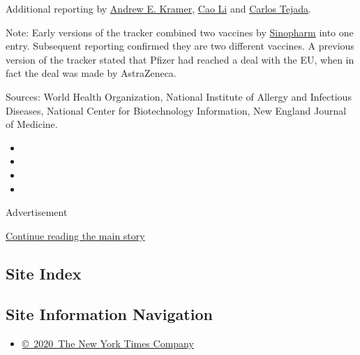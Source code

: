 Additional reporting by
\href{https://www.nytimes3xbfgragh.onion/by/andrew-e-kramer}{Andrew E.
Kramer}, \href{https://www.nytimes3xbfgragh.onion/by/cao-li}{Cao Li} and
\href{https://www.nytimes3xbfgragh.onion/by/carlos-tejada}{Carlos
Tejada}.

Note: Early versions of the tracker combined two vaccines by
\protect\hyperlink{sinopharm}{Sinopharm} into one entry. Subsequent
reporting confirmed they are two different vaccines. A previous version
of the tracker stated that Pfizer had reached a deal with the EU, when
in fact the deal was made by AstraZeneca.

Sources: World Health Organization, National Institute of Allergy and
Infectious Diseases, National Center for Biotechnology Information, New
England Journal of Medicine.

\begin{itemize}
\item
\item
\item
\item
\end{itemize}

Advertisement

\protect\hyperlink{after-bottom}{Continue reading the main story}

\hypertarget{site-index}{%
\subsection{Site Index}\label{site-index}}

\hypertarget{site-information-navigation}{%
\subsection{Site Information
Navigation}\label{site-information-navigation}}

\begin{itemize}
\tightlist
\item
  \href{https://help.nytimes3xbfgragh.onion/hc/en-us/articles/115014792127-Copyright-notice}{©~2020~The
  New York Times Company}
\end{itemize}

